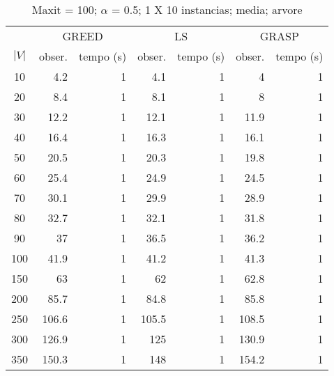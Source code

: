 \documentclass[]{article}
\title{}
\author{}
\begin{document}
\maketitle

\begin{abstract}

\end{abstract}

\section{}

\begin {table}[h]
\centering
\caption{Maxit = 100; $\alpha$ = 0.5; 1 X 10 instancias; media; arvore}
\begin{small}
	\begin{tabular}{|c|r|r|r|r|r|r|}
		\hline
		& \multicolumn{2}{c|}{GREED} & \multicolumn{2}{c|}{LS} & \multicolumn{2}{c|}{GRASP} \\ 
		\cline{2-7}
		$|V|$   &  obser. & tempo (s)  & obser. & tempo (s) & obser. & tempo (s)\\ 
		\hline
		10 & 4.2 & 1 & 4.1 & 1 & 4 & 1 \\ 
		20 & 8.4 & 1 & 8.1 & 1 & 8 & 1 \\ 
		30 & 12.2 & 1 & 12.1 & 1 & 11.9 & 1 \\ 
		40 & 16.4 & 1 & 16.3 & 1 & 16.1 & 1 \\ 
		50 & 20.5 & 1 & 20.3 & 1 & 19.8 & 1 \\ 
		60 & 25.4 & 1 & 24.9 & 1 & 24.5 & 1 \\ 
		70 & 30.1 & 1 & 29.9 & 1 & 28.9 & 1 \\ 
		80 & 32.7 & 1 & 32.1 & 1 & 31.8 & 1 \\ 
		90 & 37 & 1 & 36.5 & 1 & 36.2 & 1 \\ 
		100 & 41.9 & 1 & 41.2 & 1 & 41.3 & 1 \\ 
		150 & 63 & 1 & 62 & 1 & 62.8 & 1 \\ 
		200 & 85.7 & 1 & 84.8 & 1 & 85.8 & 1 \\ 
		250 & 106.6 & 1 & 105.5 & 1 & 108.5 & 1 \\ 
		300 & 126.9 & 1 & 125 & 1 & 130.9 & 1 \\ 
		350 & 150.3 & 1 & 148 & 1 & 154.2 & 1 \\ 
		\hline
	\end{tabular} \label{}
\end{small}
\end{table}
\end{document}
